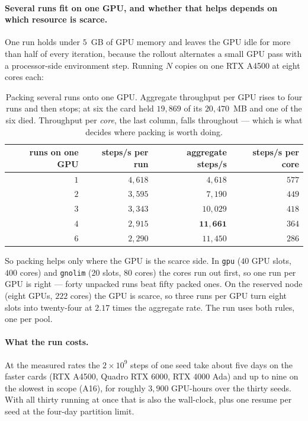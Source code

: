 \paragraph{Several runs fit on one GPU, and whether that helps depends on which resource is scarce.}
One run holds under $5$~GB of GPU memory and leaves the GPU idle for more than half of every
iteration, because the rollout alternates a small GPU pass with a processor-side environment step.
Running $N$ copies on one RTX A4500 at eight cores each:

\begin{table}[H]
\centering
\footnotesize
\setlength{\tabcolsep}{6pt}
\renewcommand{\arraystretch}{1.15}
\begin{tabular}{@{}rrrr@{}}
\toprule
\textbf{runs on one GPU} & \textbf{steps/s per run} & \textbf{aggregate steps/s} & \textbf{steps/s per core} \\
\midrule
$1$ & $4{,}618$ & $4{,}618$ & $577$ \\
$2$ & $3{,}595$ & $7{,}190$ & $449$ \\
$3$ & $3{,}343$ & $10{,}029$ & $418$ \\
$4$ & $2{,}915$ & $\mathbf{11{,}661}$ & $364$ \\
$6$ & $2{,}290$ & $11{,}450$ & $286$ \\
\bottomrule
\end{tabular}
\caption{Packing several runs onto one GPU. Aggregate throughput per GPU rises to four runs and then
stops; at six the card held $19{,}869$ of its $20{,}470$~MB and one of the six died. Throughput per
\emph{core}, the last column, falls throughout --- which is what decides where packing is worth
doing.}
\label{tab:cleanrl-packing}
\end{table}

So packing helps only where the GPU is the scarce side. In \texttt{gpu} ($40$ GPU slots, $400$
cores) and \texttt{gnolim} ($20$ slots, $80$ cores) the cores run out first, so one run per GPU is
right --- forty unpacked runs beat fifty packed ones. On the reserved node (eight GPUs, $222$ cores)
the GPU is scarce, so three runs per GPU turn eight slots into twenty-four at $2.17$ times the
aggregate rate. The run uses both rules, one per pool.

\paragraph{What the run costs.}
At the measured rates the $2\times10^{9}$ steps of one seed take about five days on the faster cards
(RTX A4500, Quadro RTX 6000, RTX 4000 Ada) and up to nine on the slowest in scope (A16), for roughly
$3{,}900$ GPU-hours over the thirty seeds. With all thirty running at once that is also the
wall-clock, plus one resume per seed at the four-day partition limit.

